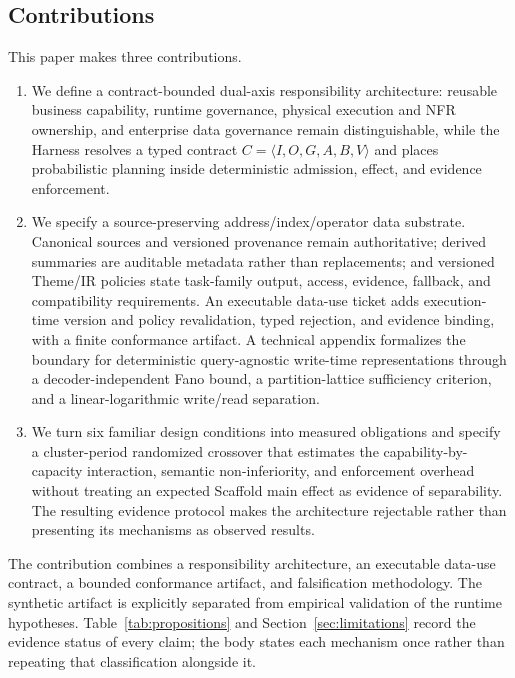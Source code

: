 \documentclass[11pt]{article}
\begin{document}
\subsection{Contributions}

This paper makes three contributions.

\begin{enumerate}
\item We define a contract-bounded dual-axis responsibility architecture: reusable business capability, runtime governance, physical execution and NFR ownership, and enterprise data governance remain distinguishable, while the Harness resolves a typed contract $C=\langle I,O,G,A,B,V\rangle$ and places probabilistic planning inside deterministic admission, effect, and evidence enforcement.
\item We specify a source-preserving address/index/operator data substrate. Canonical sources and versioned provenance remain authoritative; derived summaries are auditable metadata rather than replacements; and versioned Theme/IR policies state task-family output, access, evidence, fallback, and compatibility requirements. An executable data-use ticket adds execution-time version and policy revalidation, typed rejection, and evidence binding, with a finite conformance artifact. A technical appendix formalizes the boundary for deterministic query-agnostic write-time representations through a decoder-independent Fano bound, a partition-lattice sufficiency criterion, and a linear-logarithmic write/read separation.
\item We turn six familiar design conditions into measured obligations and specify a cluster-period randomized crossover that estimates the capability-by-capacity interaction, semantic non-inferiority, and enforcement overhead without treating an expected Scaffold main effect as evidence of separability. The resulting evidence protocol makes the architecture rejectable rather than presenting its mechanisms as observed results.
\end{enumerate}

The contribution combines a responsibility architecture, an executable data-use contract, a bounded conformance artifact, and falsification methodology. The synthetic artifact is explicitly separated from empirical validation of the runtime hypotheses. Table~\ref{tab:propositions} and Section~\ref{sec:limitations} record the evidence status of every claim; the body states each mechanism once rather than repeating that classification alongside it.
\end{document}
